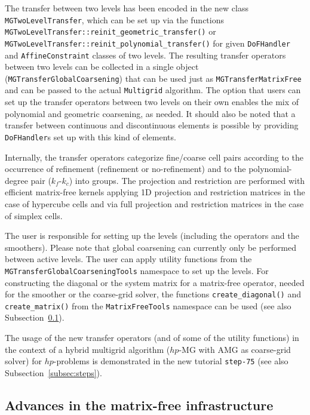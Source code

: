 \documentclass{ansarticle-preprint}
\begin{document}
The transfer between two levels has been encoded in the new class \texttt{MGTwoLevelTransfer}, which can be set up via the functions \texttt{MGTwoLevelTransfer::\allowbreak reinit\_\allowbreak geometric\_\allowbreak transfer()} or \texttt{MGTwo\allowbreak LevelTransfer::\allowbreak reinit\_\allowbreak polynomial\_\allowbreak transfer()} for given
\texttt{DoFHandler} and \texttt{AffineConstraint} classes of two levels. The resulting transfer operators
between two levels can be collected in a single object
(\texttt{MGTransferGlobalCoarsening}) that can be used just as \texttt{MGTransferMatrixFree} and can be passed to the actual \texttt{Multigrid}
algorithm. The option that users can set up the transfer operators between two levels on their own enables
the mix of polynomial  and geometric coarsening, as needed. It should also be noted that a transfer between continuous
and discontinuous elements is possible by providing \texttt{DoFHandler}s set up with this kind of elements.

Internally, the transfer operators categorize fine/coarse cell pairs according to the
occurrence of refinement
(refinement or no-refinement) and to the polynomial-degree pair ($k_f$-$k_c$) into groups.
The projection and restriction are performed with efficient matrix-free kernels applying
1D projection and restriction matrices in the case of hypercube cells and via full projection and
restriction matrices in the case of simplex cells.


The user is responsible for setting up the levels (including the operators and the
smoothers). Please note that global coarsening can currently only be performed between active levels.
The user can apply utility
functions from the \texttt{MGTransferGlobalCoarseningTools} namespace to set up the levels. For
constructing the diagonal or the system matrix for a matrix-free operator,
needed for the smoother or the coarse-grid solver,
the functions \texttt{create\_diagonal()} and \texttt{create\_matrix()} from
the \texttt{MatrixFreeTools} namespace can be used (see also Subsection~\ref{subsec:mf}).


The usage of the new transfer operators (and of some of the utility functions) in the context of a hybrid multigrid algorithm ($hp$-MG with AMG as coarse-grid solver) for $hp$-problems is demonstrated in the new tutorial \texttt{step-75} (see also Subsection~\ref{subsec:steps}).



\subsection{Advances in the matrix-free infrastructure}
\label{subsec:mf}
\end{document}
